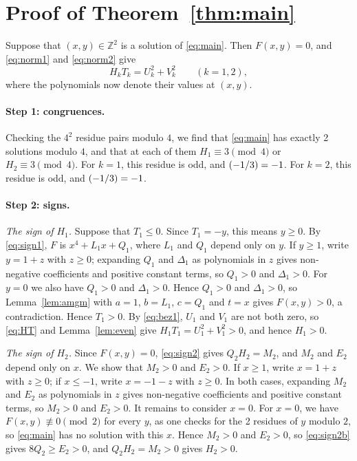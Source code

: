 \documentclass[11pt]{article}
\newcommand{\Z}{\mathbb{Z}}
\newcommand{\leg}[2]{\mathchoice{\biggl(\dfrac{#1}{#2}\biggr)}{(#1/#2)}{(#1/#2)}{(#1/#2)}}
\begin{document}
\section{Proof of Theorem~\ref{thm:main}}

Suppose that $(x,y)\in\Z^2$ is a solution of \eqref{eq:main}. Then $F(x,y)=0$, and \eqref{eq:norm1} and \eqref{eq:norm2} give
\begin{equation}\label{eq:HT}
H_kT_k=U_k^2+V_k^2\qquad(k=1,2),
\end{equation}
where the polynomials now denote their values at $(x,y)$.

\paragraph{Step 1: congruences.} Checking the $4^2$ residue pairs modulo $4$, we find that \eqref{eq:main} has exactly 2 solutions modulo $4$, and that at each of them $H_{1}\equiv3\pmod{4}$ or $H_{2}\equiv3\pmod{4}$. For $k=1$, this residue is odd, and $\leg{-1}{3}=-1$. For $k=2$, this residue is odd, and $\leg{-1}{3}=-1$.

\paragraph{Step 2: signs.} \emph{The sign of $H_{1}$.} Suppose that $T_{1}\leq0$. Since $T_{1}=-y$, this means $y\geq0$. By \eqref{eq:sign1}, $F$ is $x^4+L_{1}x+Q_{1}$, where $L_{1}$ and $Q_{1}$ depend only on $y$. If $y\geq1$, write $y=1+z$ with $z\geq0$; expanding $Q_{1}$ and $\Delta_{1}$ as polynomials in $z$ gives non-negative coefficients and positive constant terms, so $Q_{1}>0$ and $\Delta_{1}>0$. For $y=0$ we also have $Q_{1}>0$ and $\Delta_{1}>0$. Hence $Q_{1}>0$ and $\Delta_{1}>0$, so Lemma~\ref{lem:amgm} with $a=1$, $b=L_{1}$, $c=Q_{1}$ and $t=x$ gives $F(x,y)>0$, a contradiction. Hence $T_{1}>0$. By \eqref{eq:bez1}, $U_{1}$ and $V_{1}$ are not both zero, so \eqref{eq:HT} and Lemma~\ref{lem:even} give $H_{1}T_{1}=U_{1}^2+V_{1}^2>0$, and hence $H_{1}>0$.

\emph{The sign of $H_{2}$.} Since $F(x,y)=0$, \eqref{eq:sign2} gives $Q_{2}H_{2}=M_{2}$, and $M_{2}$ and $E_{2}$ depend only on $x$. We show that $M_{2}>0$ and $E_{2}>0$. If $x\geq1$, write $x=1+z$ with $z\geq0$; if $x\leq-1$, write $x=-1-z$ with $z\geq0$. In both cases, expanding $M_{2}$ and $E_{2}$ as polynomials in $z$ gives non-negative coefficients and positive constant terms, so $M_{2}>0$ and $E_{2}>0$. It remains to consider $x=0$. For $x=0$, we have $F(x,y)\not\equiv0\pmod{2}$ for every $y$, as one checks for the 2 residues of $y$ modulo $2$, so \eqref{eq:main} has no solution with this $x$. Hence $M_{2}>0$ and $E_{2}>0$, so \eqref{eq:sign2b} gives $8Q_{2}\geq E_{2}>0$, and $Q_{2}H_{2}=M_{2}>0$ gives $H_{2}>0$.
\end{document}

